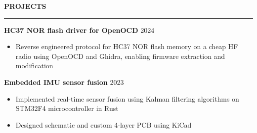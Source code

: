 \documentclass[notitlepage,10pt,a4paper]{article}
\newcommand{\linka}[2]{
   \textcolor{linkb}{\href{#1}{#2}}
}
\newenvironment{resumesection}[1]{
    \header{#1}
}{}
\newcommand{\header}[1]{
    \vspace{2pt}
    \textcolor{accent1}{\Large \textbf{#1}}
    \vspace{6pt}\hrule\vspace{4pt}
}
\newcommand{\TECH}{
    \textcolor{accent3}{\small\textbf{SKILLS}}\small\,
}
\newcommand{\thingsep}{
    \vspace{4pt}
}
\begin{document}
\begin{resumesection}{PROJECTS}
    \raggedright
    \textcolor{accent2}{\textbf{\large HC37 NOR flash driver for OpenOCD}} \hfill {2024} \\
    {\small\begin{itemize}[noitemsep, font=\small, label={-}, leftmargin=*, topsep=0pt, partopsep=0pt]
        \item Reverse engineered protocol for HC37 NOR flash memory on a cheap HF radio using OpenOCD and Ghidra, enabling firmware extraction and modification
    \end{itemize}}
    \thingsep

    

    \raggedright
    \textcolor{accent2}{\textbf{\large Embedded IMU sensor fusion}} \hfill {2023} \\
    {\small\begin{itemize}[noitemsep, font=\small, label={-}, leftmargin=*, topsep=0pt, partopsep=0pt]
        \item Implemented real-time sensor fusion using Kalman filtering algorithms on STM32F4 microcontroller in Rust
        \item Designed schematic and custom 4-layer PCB using KiCad
    \end{itemize}}
    \thingsep



\end{resumesection}
\end{document}
